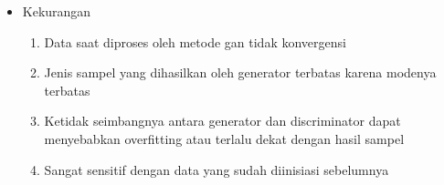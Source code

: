 \begin{enumerate}
\begin{itemize}
\begin{enumerate}
            \end{enumerate}
              \item Kekurangan
              \begin{enumerate}  
                \item Data saat diproses oleh metode gan tidak konvergensi
                \item Jenis sampel yang dihasilkan oleh generator terbatas karena modenya terbatas
                \item Ketidak seimbangnya antara generator dan discriminator dapat menyebabkan overfitting atau terlalu dekat dengan hasil sampel
                \item Sangat sensitif dengan data yang sudah diinisiasi sebelumnya
              \end{enumerate}
            \end{itemize}

        \end{enumerate}
